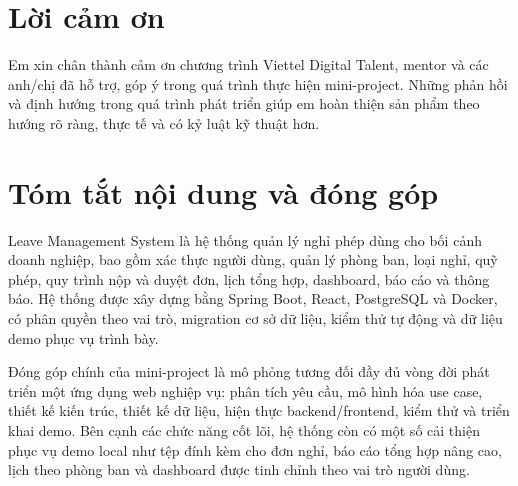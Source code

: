 \documentclass[12pt,a4paper,oneside]{extreport}
\begin{document}
\chapter*{Lời cảm ơn}
Em xin chân thành cảm ơn chương trình Viettel Digital Talent, mentor và các anh/chị đã hỗ trợ, góp ý trong quá trình thực hiện mini-project. Những phản hồi và định hướng trong quá trình phát triển giúp em hoàn thiện sản phẩm theo hướng rõ ràng, thực tế và có kỷ luật kỹ thuật hơn.

\chapter*{Tóm tắt nội dung và đóng góp}
Leave Management System là hệ thống quản lý nghỉ phép dùng cho bối cảnh doanh nghiệp, bao gồm xác thực người dùng, quản lý phòng ban, loại nghỉ, quỹ phép, quy trình nộp và duyệt đơn, lịch tổng hợp, dashboard, báo cáo và thông báo. Hệ thống được xây dựng bằng Spring Boot, React, PostgreSQL và Docker, có phân quyền theo vai trò, migration cơ sở dữ liệu, kiểm thử tự động và dữ liệu demo phục vụ trình bày.

Đóng góp chính của mini-project là mô phỏng tương đối đầy đủ vòng đời phát triển một ứng dụng web nghiệp vụ: phân tích yêu cầu, mô hình hóa use case, thiết kế kiến trúc, thiết kế dữ liệu, hiện thực backend/frontend, kiểm thử và triển khai demo. Bên cạnh các chức năng cốt lõi, hệ thống còn có một số cải thiện phục vụ demo local như tệp đính kèm cho đơn nghỉ, báo cáo tổng hợp nâng cao, lịch theo phòng ban và dashboard được tinh chỉnh theo vai trò người dùng.

\end{document}
